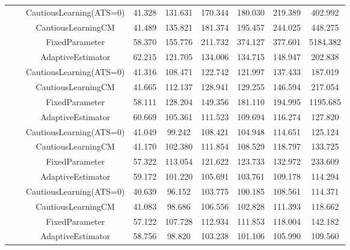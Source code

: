 \begin{table}[!h]
\begin{tabular}[t]{ccccccccc}
 &  & CautiousLearning(ATS=0) & 41.328 & 131.631 & 170.344 & 180.030 & 219.389 & 402.992\\

 &  & CautiousLearningCM & 41.489 & 135.821 & 181.374 & 195.457 & 244.025 & 448.275\\

 & \multirow[t]{-4}{*}{\centering\arraybackslash 0.35} & FixedParameter & 58.370 & 155.776 & 211.732 & 374.127 & 377.601 & 5184.382\\
\cmidrule{2-9}
 &  & AdaptiveEstimator & 62.215 & 121.705 & 134.006 & 134.715 & 148.947 & 202.838\\

 &  & CautiousLearning(ATS=0) & 41.316 & 108.471 & 122.742 & 121.997 & 137.433 & 187.019\\

 &  & CautiousLearningCM & 41.665 & 112.137 & 128.941 & 129.255 & 146.594 & 217.054\\

 & \multirow[t]{-4}{*}{\centering\arraybackslash 0.50} & FixedParameter & 58.111 & 128.204 & 149.356 & 181.110 & 194.995 & 1195.685\\
\cmidrule{2-9}
 &  & AdaptiveEstimator & 60.669 & 105.361 & 111.523 & 109.694 & 116.274 & 127.820\\

 &  & CautiousLearning(ATS=0) & 41.049 & 99.242 & 108.421 & 104.948 & 114.651 & 125.124\\

 &  & CautiousLearningCM & 41.170 & 102.380 & 111.854 & 108.529 & 118.797 & 133.725\\

 & \multirow[t]{-4}{*}{\centering\arraybackslash 0.75} & FixedParameter & 57.322 & 113.054 & 121.622 & 123.733 & 132.972 & 233.609\\
\cmidrule{2-9}
 &  & AdaptiveEstimator & 59.172 & 101.220 & 105.691 & 103.761 & 109.178 & 114.294\\

 &  & CautiousLearning(ATS=0) & 40.639 & 96.152 & 103.775 & 100.185 & 108.561 & 114.371\\

 &  & CautiousLearningCM & 41.083 & 98.686 & 106.556 & 102.828 & 111.393 & 118.662\\

 & \multirow[t]{-4}{*}{\centering\arraybackslash 1.00} & FixedParameter & 57.122 & 107.728 & 112.934 & 111.853 & 118.004 & 142.182\\
\cmidrule{2-9}
 &  & AdaptiveEstimator & 58.756 & 98.820 & 103.238 & 101.106 & 105.990 & 109.560\\


\end{tabular}
\end{table}

